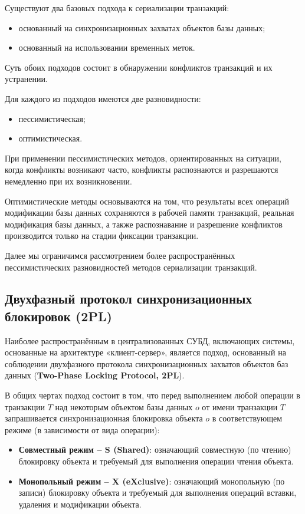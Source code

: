 \documentclass[a4paper,12pt]{article}
\begin{document}
Существуют два базовых подхода к сериализации транзакций:
\begin{itemize}
    \item основанный на синхронизационных захватах объектов базы данных;
    \item основанный на использовании временных меток.
\end{itemize}
Суть обоих подходов состоит в обнаружении конфликтов транзакций и их устранении.

Для каждого из подходов имеются две разновидности:
\begin{itemize}
    \item пессимистическая;
    \item оптимистическая.
\end{itemize}

При применении пессимистических методов, ориентированных на ситуации, когда конфликты возникают часто, конфликты распознаются и разрешаются немедленно при их возникновении.

Оптимистические методы основываются на том, что результаты всех операций модификации базы данных сохраняются в рабочей памяти транзакций, реальная модификация базы данных, а также распознавание и разрешение конфликтов производится только на стадии фиксации транзакции.

Далее мы ограничимся рассмотрением более распространённых пессимистических разновидностей методов сериализации транзакций.

\subsection{Двухфазный протокол синхронизационных блокировок (2PL)}

Наиболее распространённым в централизованных СУБД, включающих системы, основанные на архитектуре «клиент-сервер», является подход, основанный на соблюдении двухфазного протокола синхронизационных захватов объектов баз данных (\textbf{Two-Phase Locking Protocol, 2PL}).

В общих чертах подход состоит в том, что перед выполнением любой операции в транзакции $T$ над некоторым объектом базы данных $o$ от имени транзакции $T$ запрашивается синхронизационная блокировка объекта $o$ в соответствующем режиме (в зависимости от вида операции):
\begin{itemize}
    \item \textbf{Совместный режим – S (Shared)}: означающий совместную (по чтению) блокировку объекта и требуемый для выполнения операции чтения объекта.
    \item \textbf{Монопольный режим – X (eXclusive)}: означающий монопольную (по записи) блокировку объекта и требуемый для выполнения операций вставки, удаления и модификации объекта.
\end{itemize}
\end{document}
